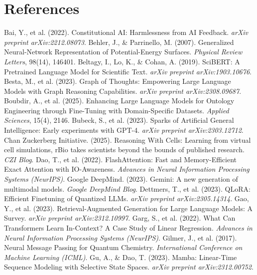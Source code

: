 \documentclass{article}
\begin{document}
\section*{References}
\begin{thebibliography}{99}
Bai, Y., et al. (2022). Constitutional AI: Harmlessness from AI Feedback. \textit{arXiv preprint arXiv:2212.08073}.
Behler, J., \& Parrinello, M. (2007). Generalized Neural-Network Representation of Potential-Energy Surfaces. \textit{Physical Review Letters}, 98(14), 146401.
Beltagy, I., Lo, K., \& Cohan, A. (2019). SciBERT: A Pretrained Language Model for Scientific Text. \textit{arXiv preprint arXiv:1903.10676}.
Besta, M., et al. (2023). Graph of Thoughts: Empowering Large Language Models with Graph Reasoning Capabilities. \textit{arXiv preprint arXiv:2308.09687}.
Boubdir, A., et al. (2025). Enhancing Large Language Models for Ontology Engineering through Fine-Tuning with Domain-Specific Datasets. \textit{Applied Sciences}, 15(4), 2146.
Bubeck, S., et al. (2023). Sparks of Artificial General Intelligence: Early experiments with GPT-4. \textit{arXiv preprint arXiv:2303.12712}.
Chan Zuckerberg Initiative. (2025). Reasoning With Cells: Learning from virtual cell simulations, rBio takes scientists beyond the bounds of published research. \textit{CZI Blog}.
Dao, T., et al. (2022). FlashAttention: Fast and Memory-Efficient Exact Attention with IO-Awareness. \textit{Advances in Neural Information Processing Systems (NeurIPS)}.
Google DeepMind. (2023). Gemini: A new generation of multimodal models. \textit{Google DeepMind Blog}.
Dettmers, T., et al. (2023). QLoRA: Efficient Finetuning of Quantized LLMs. \textit{arXiv preprint arXiv:2305.14314}.
Gao, Y., et al. (2023). Retrieval-Augmented Generation for Large Language Models: A Survey. \textit{arXiv preprint arXiv:2312.10997}.
Garg, S., et al. (2022). What Can Transformers Learn In-Context? A Case Study of Linear Regression. \textit{Advances in Neural Information Processing Systems (NeurIPS)}.
Gilmer, J., et al. (2017). Neural Message Passing for Quantum Chemistry. \textit{International Conference on Machine Learning (ICML)}.
Gu, A., \& Dao, T. (2023). Mamba: Linear-Time Sequence Modeling with Selective State Spaces. \textit{arXiv preprint arXiv:2312.00752}.

\end{thebibliography}
\end{document}
